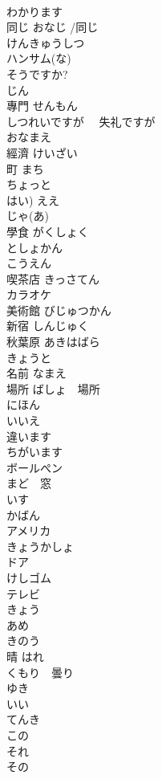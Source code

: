 \documentclass[8pt]{extreport}
\begin{document}
\begin{CJK}{UTF8}{min}
\\	わかります
\\	同じ	おなじ /同じ
\\	けんきゅうしつ
\\	ハンサム(な) 
\\	そうですか?
\\	じん
\\	專門	せんもん
\\	しつれいですが 　失礼ですが
\\	おなまえ
\\	經濟	けいざい 
\\	町	まち
\\	ちょっと
\\	はい)	ええ
\\	じゃ(あ)
\\	學食	がくしょく
\\	としょかん
\\	こうえん
\\	喫茶店	きっさてん
\\	カラオケ　
\\	美術館	びじゅつかん
\\	新宿	しんじゅく
\\	秋葉原	あきはばら
\\	きょうと
\\	名前	なまえ
\\	場所	ばしょ　場所　
\\	にほん
\\	いいえ
\\	違います
\\	ちがいます
\\	ボールぺン　
\\	まど　窓
\\	いす
\\	かばん
\\	アメリカ　
\\	きょうかしょ
\\	ドア　
\\	けしゴム　
\\	テレビ　
\\	きょう
\\	あめ
\\	きのう
\\	晴	はれ
\\	くもり　曇り
\\	ゆき
\\	いい
\\	てんき
\\	この
\\	それ
\\	その

\end{CJK}
\end{document}
